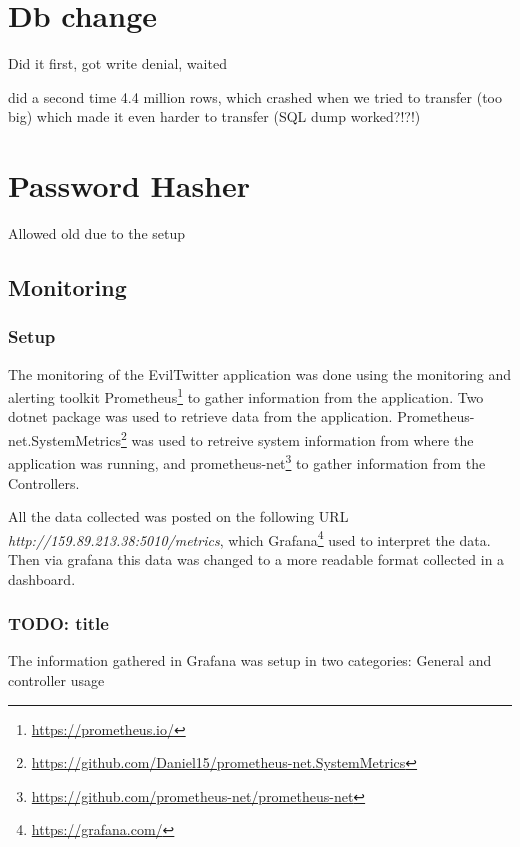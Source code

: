 \documentclass[report/main.tex]{subfiles}
\begin{document}
    \section{Db change}
        Did it first, got write denial, waited 
        
        did a second time 4.4 million rows, which crashed when we tried to transfer (too big) which made it even harder to transfer (SQL dump worked?!?!)

    \section{Password Hasher}
        Allowed old due to the setup
        
    \subsection{Monitoring}
        \label{SubSec:monitoring}
            \subsubsection{Setup}
                The monitoring of the EvilTwitter application was done using the monitoring and alerting toolkit Prometheus\footnote{\hyperlink{https://prometheus.io/}{https://prometheus.io/}} to gather information from the application. Two dotnet package was used to retrieve data from the application. Prometheus-net.SystemMetrics\footnote{\hyperlink{https://github.com/Daniel15/prometheus-net.SystemMetrics}{https://github.com/Daniel15/prometheus-net.SystemMetrics}} was used to retreive system information from where the application was running, and prometheus-net\footnote{\hyperlink{https://github.com/prometheus-net/prometheus-net}{https://github.com/prometheus-net/prometheus-net}} to gather information from the Controllers.
                
                All the data collected was posted on the following URL \textit{http://159.89.213.38:5010/metrics}, which Grafana\footnote{\hyperlink{https://grafana.com/}{https://grafana.com/}} used to interpret the data. Then via grafana this data was changed to a more readable format collected in a dashboard.
            
            \subsubsection{TODO: title}
                The information gathered in Grafana was setup in two categories: General and controller usage
                
\end{document}

